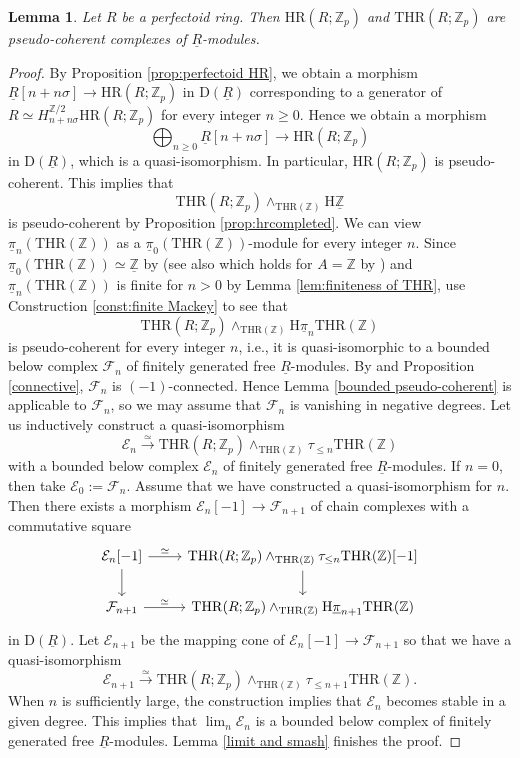 \documentclass[10pt]{amsart}
\newtheorem{lem}[thm]{Lemma}
\theoremstyle{definition}
\numberwithin{equation}{section}
\newcommand{\Z}{\mathbb{Z}}
\newcommand{\cE}{\mathcal{E}}
\newcommand{\cF}{\mathcal{F}}
\newcommand{\rD}{\mathrm{D}}
\newcommand{\rH}{\mathrm{H}}
\newcommand{\ul}{\underline}
\newcommand{\HR}{\mathrm{HR}}
\newcommand{\THR}{\mathrm{THR}}
\begin{document}
\begin{lem}
\label{lem:pseudo-coherence}
Let $R$ be a perfectoid ring.
Then $\HR(R;\Z_p)$ and $\THR(R;\Z_p)$ are pseudo-coherent complexes of $\ul{R}$-modules.
\end{lem}
\begin{proof}
By Proposition \ref{prop:perfectoid HR},
we obtain a morphism $\ul{R}[n+n\sigma]\to \HR(R;\Z_p)$ in $\rD(\ul{R})$ corresponding to a generator of $R\simeq H_{n+n\sigma}^{\Z/2}\HR(R;\Z_p)$ for every integer $n\geq 0$.
Hence we obtain a morphism
\[
\bigoplus_{n\geq 0} \ul{R}[n+n\sigma]
\to
\HR(R;\Z_p)
\]
in $\rD(\ul{R})$,
which is a quasi-isomorphism.
In particular,
$\HR(R;\Z_p)$ is pseudo-coherent.
This implies that
\[
\THR(R;\Z_p)
\wedge_{\THR(\Z)}
\rH \ul{\Z}
\]
is pseudo-coherent by Proposition \ref{prop:hrcompleted}.
We can view $\ul{\pi}_n(\THR(\Z))$ as a $\ul{\pi}_0(\THR(\Z))$-module for every integer $n$.
Since $\ul{\pi}_0(\THR(\Z))\simeq \ul{\Z}$ by \cite[Theorem 5.1]{DMPR21} (see also \cite[Proposition 2.3.5]{HP23} which holds for $A=\Z$ by \cite{HP23erratum}) and $\ul{\pi}_n(\THR(\Z))$ is finite for $n>0$ by Lemma \ref{lem:finiteness of THR},
use Construction \ref{const:finite Mackey} to see that
\[
\THR(R;\Z_p)
\wedge_{\THR(\Z)}
\rH \ul{\pi}_{n} \THR(\Z)
\]
is pseudo-coherent
for every integer $n$,
i.e.,
it is quasi-isomorphic to a bounded below complex $\cF_n$ of finitely generated free $\ul{R}$-modules.
By \cite[Corollary 6.8.1]{BGS20} and Proposition \ref{connective}, $\cF_n$ is $(-1)$-connected.
Hence Lemma \ref{bounded pseudo-coherent} is applicable to $\cF_n$,
so
we may assume that $\cF_n$ is vanishing in negative degrees.
Let us inductively construct a quasi-isomorphism
\[
\cE_n
\xrightarrow{\simeq}
\THR(R;\Z_p)
\wedge_{\THR(\Z)}
\tau_{\leq n} \THR(\Z)
\]
with a bounded below complex $\cE_n$ of finitely generated free $\ul{R}$-modules.
If $n=0$,
then take $\cE_0:=\cF_n$.
Assume that we have constructed a quasi-isomorphism for $n$.
Then there exists a morphism $\cE_n[-1]\to \cF_{n+1}$ of chain complexes with a commutative square
\[
\begin{tikzcd}
\cE_{n}[-1]
\ar[d]\ar[r,"\simeq"]&
\THR(R;\Z_p)
\wedge_{\THR(\Z)}
\tau_{\leq n} \THR(\Z)[-1]\ar[d]
\\
\cF_{n+1}
\ar[r,"\simeq"]&
\THR(R;\Z_p)
\wedge_{\THR(\Z)}
\rH \ul{\pi}_{n+1} \THR(\Z)
\end{tikzcd}
\]
in $\rD(\ul{R})$.
Let $\cE_{n+1}$ be the mapping cone of $\cE_n[-1]\to \cF_{n+1}$ so that we have a quasi-isomorphism
\[
\cE_{n+1}
\xrightarrow{\simeq}
\THR(R;\Z_p)
\wedge_{\THR(\Z)}
\tau_{\leq n+1} \THR(\Z).
\]
When $n$ is sufficiently large,
the construction implies that $\cE_n$ becomes stable in a given degree.
This implies that $\lim_n \cE_n$ is a bounded below complex of finitely generated free $\ul{R}$-modules.
Lemma \ref{limit and smash} finishes the proof.
\end{proof}
\end{document}
